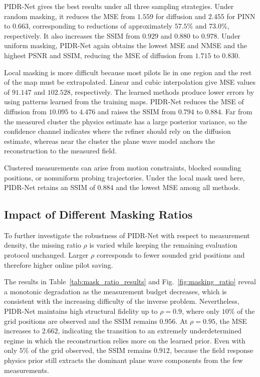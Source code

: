 \documentclass[lettersize,journal]{IEEEtran}
\begin{document}
PIDR-Net gives the best results under all three sampling strategies. Under random masking, it reduces the MSE from $1.559$ for diffusion and $2.455$ for PINN to $0.663$, corresponding to reductions of approximately $57.5\%$ and $73.0\%$, respectively. It also increases the SSIM from $0.929$ and $0.880$ to $0.978$. Under uniform masking, PIDR-Net again obtains the lowest MSE and NMSE and the highest PSNR and SSIM, reducing the MSE of diffusion from $1.715$ to $0.830$.

Local masking is more difficult because most pilots lie in one region and the rest of the map must be extrapolated. Linear and cubic interpolation give MSE values of $91.147$ and $102.528$, respectively. The learned methods produce lower errors by using patterns learned from the training maps. PIDR-Net reduces the MSE of diffusion from $10.095$ to $4.476$ and raises the SSIM from $0.794$ to $0.884$. Far from the measured cluster the physics estimate has a large posterior variance, so the confidence channel indicates where the refiner should rely on the diffusion estimate, whereas near the cluster the plane wave model anchors the reconstruction to the measured field.

Clustered measurements can arise from motion constraints, blocked sounding positions, or nonuniform probing trajectories. Under the local mask used here, PIDR-Net retains an SSIM of $0.884$ and the lowest MSE among all methods.

\subsection{Impact of Different Masking Ratios}
To further investigate the robustness of PIDR-Net with respect to measurement density, the missing ratio $\rho$ is varied while keeping the remaining evaluation protocol unchanged. Larger $\rho$ corresponds to fewer sounded grid positions and therefore higher online pilot saving.

The results in Table~\ref{tab:mask_ratio_results} and Fig.~\ref{fig:masking_ratio} reveal a monotonic degradation as the measurement budget decreases, which is consistent with the increasing difficulty of the inverse problem. Nevertheless, PIDR-Net maintains high structural fidelity up to $\rho=0.9$, where only $10\%$ of the grid positions are observed and the SSIM remains $0.956$. At $\rho=0.95$, the MSE increases to $2.662$, indicating the transition to an extremely underdetermined regime in which the reconstruction relies more on the learned prior. Even with only $5\%$ of the grid observed, the SSIM remains $0.912$, because the field response physics prior still extracts the dominant plane wave components from the few measurements.
\end{document}

